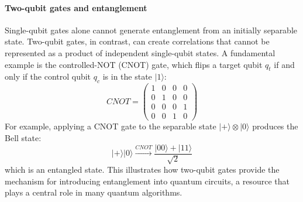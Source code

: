 \paragraph{Two-qubit gates and entanglement}
Single-qubit gates alone cannot generate entanglement from an initially separable state. Two-qubit gates, in contrast, can create correlations that cannot be represented as a product of independent single-qubit states. A fundamental example is the controlled-NOT (CNOT) gate, which flips a target qubit $q_t$ if and only if the control qubit $q_c$ is in the state $|1\rangle$:
\begin{equation}
CNOT=
\begin{pmatrix}
1&0&0&0\\
0&1&0&0\\
0&0&0&1\\
0&0&1&0
\end{pmatrix}
\end{equation}
For example, applying a CNOT gate to the separable state $|+\rangle\otimes|0\rangle$ produces the Bell state:
\begin{equation}
|+\rangle|0\rangle
\xrightarrow{CNOT}
\frac{|00\rangle+|11\rangle}{\sqrt{2}}
\end{equation}
which is an entangled state. This illustrates how two-qubit gates provide the mechanism for introducing entanglement into quantum circuits, a resource that plays a central role in many quantum algorithms.

